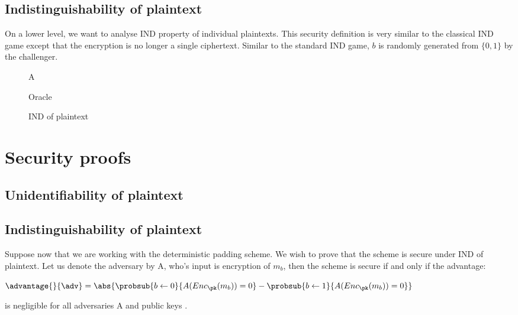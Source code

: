 \documentclass[10pt]{article}
\begin{document}
\subsection{Indistinguishability of plaintext}
On a lower level, we want to analyse IND property of individual plaintexts. This security definition is very similar to the classical IND game except that the encryption is no longer a single ciphertext. Similar to the standard IND game, $b$ is randomly generated from $\{0,1\}$ by the challenger.

\begin{figure}[H]
\begin{center}
\begin{bbrenv}{A}
\begin{bbrbox}[name = Adversary, minheight=3.5cm, minwidth = 2.5cm]
\end{bbrbox}
			
\bbrmsgspace{1cm}
\bbrmsgspace{1cm}
			
			
\begin{bbroracle}{Oracle}
\begin{bbrbox}[name = Encryption, minheight = 1cm]
\end{bbrbox}
\end{bbroracle}
\bbroracleqryspace{0.1cm}
\bbroracleqryspace{0.5cm}
\end{bbrenv}
		
\caption{IND of plaintext}
\end{center}
\end{figure}



\section{Security proofs}
\subsection{Unidentifiability of plaintext}







\subsection{Indistinguishability of plaintext}
Suppose now that we are working with the deterministic padding scheme. We wish to prove that the scheme is secure under IND of plaintext. Let us denote the adversary by A, who's input is encryption of $m_b$, then the scheme is secure if and only if the advantage:
\begin{center}
	$\advantage{}{\adv} = \abs{\probsub{b \gets 0}{A(Enc_\pk(m_b)) = 0} - \probsub{b \gets 1}{A(Enc_\pk(m_b)) = 0}}$
\end{center}
is negligible for all adversaries A and public keys \pk.
\end{document}
